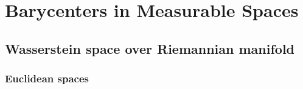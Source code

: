 \documentclass{report}
\theoremstyle{remark}
\theoremstyle{definition}
\begin{document}

\part{Barycenters in Measurable Spaces}

\chapter{Wasserstein space over Riemannian manifold}
\section{Euclidean spaces}



\printbibliography
\end{document}
